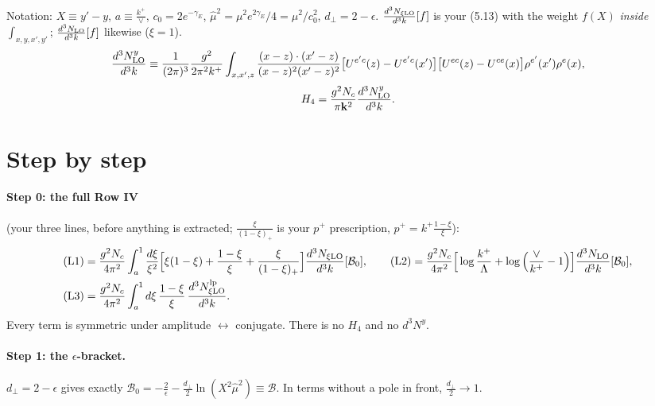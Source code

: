 \documentclass[10pt]{article}
\numberwithin{equation}{section}
\begin{document}
Notation: $X\equiv y'-y$, $a\equiv\frac{k^+}{\vee}$, $c_0=2e^{-\gamma_E}$, $\hat\mu^2=\mu^2e^{2\gamma_E}/4=\mu^2/c_0^2$, $d_\perp=2-\epsilon$. $\frac{d^3N_{\xi\rm LO}}{d^3k}[f]$ is your (5.13) with the weight $f(X)$ \emph{inside} $\int_{x,y,x',y'}$; $\frac{d^3N_{\rm LO}}{d^3k}[f]$ likewise ($\xi=1$).
\begin{equation}
\frac{d^3N^y_{\rm LO}}{d^3k}\equiv\frac{1}{(2\pi)^3}\frac{g^2}{2\pi^2k^+}\int_{x,x',z}\frac{(x-z)\cdot(x'-z)}{(x-z)^2(x'-z)^2}\big[U^{e'c}(z)-U^{e'c}(x')\big]\big[U^{ec}(z)-U^{ce}(x)\big]\rho^{e'}(x')\rho^{e}(x),\label{eq:LOy}\end{equation}\begin{equation}H_4=\frac{g^2N_c}{\pi\mathbf k^2}\frac{d^3N^y_{\rm LO}}{d^3k}.
\end{equation}

\section{Step by step}
\paragraph{Step 0: the full Row IV} (your three lines, before anything is extracted; $\frac{\xi}{(1-\xi)_+}$ is your $p^+$ prescription, $p^+=k^+\frac{1-\xi}{\xi}$):
\begin{align}
\text{(L1)}&=\frac{g^2N_c}{4\pi^2}\int_a^1\frac{d\xi}{\xi^2}\Big[\xi(1-\xi)+\frac{1-\xi}{\xi}+\frac{\xi}{(1-\xi)_+}\Big]\frac{d^3N_{\xi\rm LO}}{d^3k}[\mathcal B_0],\qquad
\text{(L2)}=\frac{g^2N_c}{4\pi^2}\Big[\log\frac{k^+}{\Lambda}+\log\Big(\frac{\vee}{k^+}-1\Big)\Big]\frac{d^3N_{\rm LO}}{d^3k}[\mathcal B_0],\notag\\
\text{(L3)}&=\frac{g^2N_c}{4\pi^2}\int_a^{1}d\xi\,\frac{1-\xi}{\xi}\,\frac{d^3N^{\rm lp}_{\xi\rm LO}}{d^3k}.
\end{align}
Every term is symmetric under amplitude $\leftrightarrow$ conjugate. There is no $H_4$ and no $d^3N^y$.

\paragraph{Step 1: the $\epsilon$-bracket.} $d_\perp=2-\epsilon$ gives exactly $\mathcal B_0=-\frac2\epsilon-\frac{d_\perp}{2}\ln(X^2\hat\mu^2)\equiv\mathcal B$. In terms without a pole in front, $\frac{d_\perp}{2}\to1$.
\end{document}
